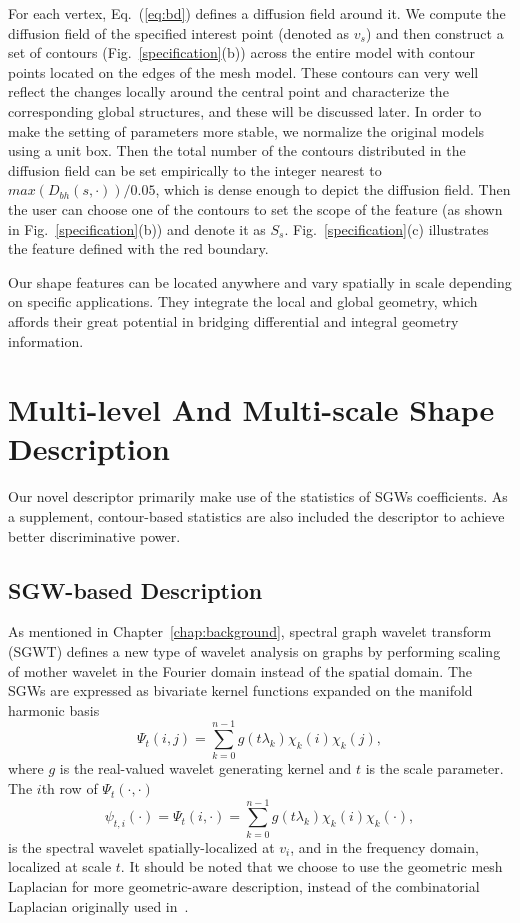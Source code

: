 For each vertex, Eq.~(\ref{eq:bd}) defines a diffusion field around
it. We compute the diffusion field of the specified interest point
(denoted as $v_s$) and then construct a set of contours
(Fig.~\ref{specification}(b)) across the entire model with contour
points located on the edges of the mesh model. These contours can very
well reflect the changes locally around the central point and
characterize the corresponding global structures, and these will be
discussed later. In order to make the setting of parameters more
stable, we normalize the original models using a unit box. Then the
total number of the contours distributed in the diffusion field can be
set empirically to the integer nearest to $max(D_{bh}(s,\cdot))/0.05$,
which is dense enough to depict the diffusion field. Then the user can
choose one of the contours to set the scope of the feature (as shown
in Fig.~\ref{specification}(b)) and denote it as $S_{s}$.
Fig.~\ref{specification}(c) illustrates the feature defined with the
red boundary.

Our shape features can be located anywhere and vary spatially in scale
depending on specific applications. They integrate the local and global
geometry, which affords their great potential in bridging differential
and integral geometry information.

\section{Multi-level And Multi-scale Shape Description}
\label{sec:Des}

Our novel descriptor primarily make use of the statistics
of SGWs coefficients. As a supplement, contour-based statistics are also
included the descriptor to achieve better discriminative power.

\subsection{SGW-based Description}

As mentioned in Chapter~\ref{chap:background}, spectral graph wavelet transform (SGWT)
defines a new type of wavelet analysis on graphs by performing scaling of mother wavelet
in the Fourier domain instead of the spatial domain. The SGWs are expressed as bivariate
kernel functions expanded on the manifold harmonic basis
\begin{equation}
\label{eq:SGW}
\Psi_{t}(i,j)=\sum_{k=0}^{n-1}g(t\lambda_k) \chi_k(i)\chi_k(j),
\end{equation}
where $g$ is the real-valued wavelet generating kernel and $t$ is the
scale parameter. The $i$th row of $\Psi_{t}(\cdot,\cdot)$
\begin{equation}
\label{eq:SGW_vert}
\psi_{t,i}(\cdot) = \Psi_{t}(i,\cdot)=\sum_{k=0}^{n-1}g(t\lambda_k) \chi_k(i)\chi_k(\cdot),
\end{equation}
is the spectral wavelet spatially-localized at $v_i$, and in the
frequency domain, localized at scale $t$. It should be noted that
we choose to use the geometric mesh Laplacian for more geometric-aware
description, instead of the combinatorial Laplacian originally used
in~\cite{Hammond2011}.

